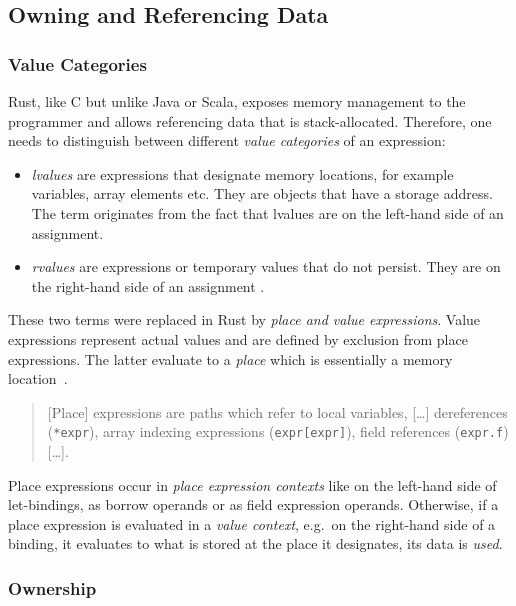 \subsection{Owning and Referencing Data}

\subsubsection{Value Categories}

Rust, like C but unlike Java or Scala, exposes memory management to the
programmer and allows referencing data that is stack-allocated. Therefore,  one
needs to distinguish between different \emph{value categories} of an expression:

\begin{itemize}
\tightlist
\item
  \emph{lvalues} are expressions that designate memory locations, for
  example variables, array elements etc. They are objects that have a
  storage address. The term originates from the fact that lvalues are on
  the left-hand side of an assignment.
\item
  \emph{rvalues} are expressions or temporary values that do not
  persist. They are on the right-hand side of an assignment \cite{wiki:lvalues}.
\end{itemize}

These two terms were replaced in Rust by \emph{place and value expressions}.
Value expressions represent actual values and are defined by exclusion from
place expressions. The latter evaluate to a \emph{place} which is essentially a
memory location~\cite{rustref}.

\begin{quote}
{[}Place{]} expressions are paths which refer to local variables,
{[}\ldots{]} dereferences (\passthrough{\lstinline!*expr!}), array
indexing expressions (\passthrough{\lstinline!expr[expr]!}), field
references (\passthrough{\lstinline!expr.f!}) {[}\ldots{]}. \\
\cite[section ``Expressions'']{rustref}
\end{quote}

Place expressions occur in \emph{place expression contexts} like on the
left-hand side of let-bindings, as borrow operands or as field expression
operands. Otherwise, if a place expression is evaluated in a \emph{value
context}, e.g.~on the right-hand side of a binding, it evaluates to what is
stored at the place it designates, its data is \emph{used}.

\subsubsection{Ownership}

